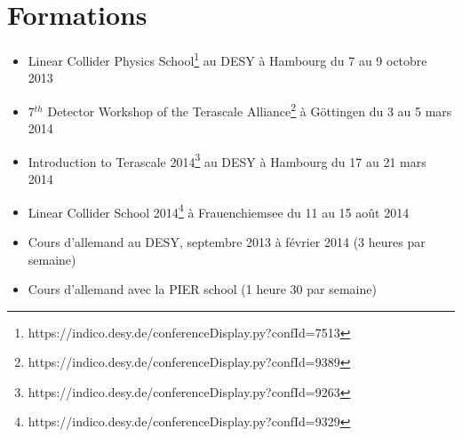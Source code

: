 \documentclass[a4papper, 10pt]{article}
\begin{document}
  \section{Formations}
 
  \begin{itemize}
    \item  Linear Collider Physics School\footnote{https://indico.desy.de/conferenceDisplay.py?confId=7513} au DESY à Hambourg du 7 au 9 octobre 2013
    \item  7$^{th}$ Detector Workshop of the Terascale Alliance\footnote{https://indico.desy.de/conferenceDisplay.py?confId=9389} à Göttingen du 3 au 5 mars 2014
    \item  Introduction to Terascale 2014\footnote{https://indico.desy.de/conferenceDisplay.py?confId=9263} au DESY à Hambourg du 17 au 21 mars 2014
    \item  Linear Collider School 2014\footnote{https://indico.desy.de/conferenceDisplay.py?confId=9329} à Frauenchiemsee du 11 au 15 août 2014
    \item Cours d'allemand au DESY, septembre 2013 à février 2014 (3 heures par semaine)
    \item Cours d'allemand avec la PIER school (1 heure 30 par semaine)
  \end{itemize}

 
\end{document}
